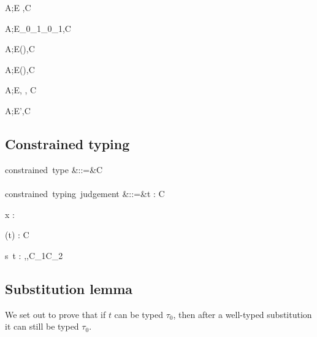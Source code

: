 \documentclass{amsart}
\theoremstyle{definition}
\begin{document}
{A;E \vdash \tau\Sub\tau,C}

{A;E\vdash\sigma_0\R\sigma_1\Sub\tau_0\R\tau_1,C}


{A;E\vdash(\All\alpha\sigma)\Sub\tau,C}

{A;E\vdash\sigma\Sub(\All\alpha\tau),C}

{A;E\vdash \sigma\Sub\tau, \sigma\Sub\tau, C}


{A;E\vdash \sigma\Sub\tau',C}

\subsection{Constrained typing}
\begin{syntax}
\mbox{constrained type}
&::=&\tau \Given C
\\\\
\mbox{constrained typing judgement}
&::=&\Gamma \vdash t : \tau \Given C
\end{syntax}%
{\Gamma\vdash x : \tau \Given \emptyset}

{\Gamma\vdash (t) : \sigma\R\tau \Given C}

{\Gamma\vdash s~t : \beta \Given
\sigma\Sub\alpha\R\beta,\tau\Sub\alpha,C_1\cup C_2}

\subsection{Substitution lemma}
We set out to prove that if $t$ can be typed $\tau_0$, then after
a well-typed substitution it can still be typed $\tau_0$.
\end{document}
